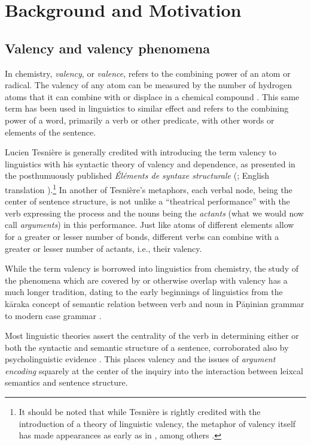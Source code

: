 \section{Background and Motivation}

\subsection{Valency and valency phenomena}


In chemistry, \textit{valency}, or \textit{valence}, refers to the combining power of an atom or radical. The valency of any atom can be measured by the number of hydrogen atoms that it can combine with or displace in a chemical compound \citep{law2020a}. This same term has been used in linguistics to similar effect and refers to the combining power of a word, primarily a verb or other predicate, with other words or elements of the sentence. 

Lucien Tesnière is generally credited with introducing the term valency to linguistics with his syntactic theory of valency and dependence, as presented in the posthumuously published \textit{Éléments de syntaxe structurale} (\cite*{tesniere1959}; English translation \cite*{tesniere2015}).\footnote{
    It should be noted that while Tesnière is rightly credited with the introduction of a theory of linguistic valency, the metaphor of valency itself has made appearances as early as in \citet{peirce1897}, among others \citep{przepiorkowski2018}.
}
In another of Tesnière's metaphors, each verbal node, being the center of sentence structure, is not unlike a ``theatrical performance'' with the verb expressing the process and the nouns being the \textit{actants} (what we would now call \textit{arguments}) in this performance. Just like atoms of different elements allow for a greater or lesser number of bonds, different verbs can combine with a greater or lesser number of actants, i.e., their valency.

While the term valency is borrowed into linguistics from chemistry, the study of the phenomena which are covered by or otherwise overlap with valency has a much longer tradition, dating to the early beginnings of linguistics from the kāraka concept of semantic relation between verb and noun \citep{ganeri2011a} in Pāṇinian grammar to modern case grammar \citep{fillmore1967}. 

Most linguistic theories assert the centrality of the verb in determining either or both the syntactic and semantic structure of a sentence, corroborated also by psycholinguistic evidence \citep{healy1970}. This places valency and the issues of \textit{argument encoding} squarely at the center of the inquiry into the interaction between leixcal semantics and sentence structure.


